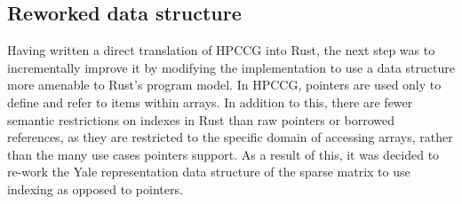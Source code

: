 \subsection{Reworked data structure}
\label{sec:translation-reworked-data-structure}

Having written a direct translation of HPCCG into Rust, the next step was to incrementally improve it by modifying the implementation to use a data structure more amenable to Rust's program model.
In HPCCG, pointers are used only to define and refer to items within arrays. In addition to this, there are fewer semantic restrictions on indexes in Rust than raw pointers or borrowed references, as they are restricted to the specific domain of accessing arrays, rather than the many use cases pointers support. As a result of this, it was decided to re-work the Yale representation data structure of the sparse matrix to use indexing as opposed to pointers.



